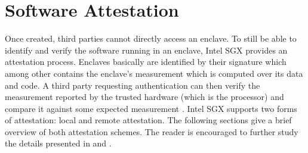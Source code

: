 \section{Software Attestation}
Once created, third parties cannot directly access an enclave. To still be able to identify and verify the software running in an enclave, Intel SGX provides an attestation process.
Enclaves basically are identified by their signature which among other contains the enclave's measurement which is computed over its data and code. A third party requesting
authentication can then verify the measurement reported by the trusted hardware (which is the processor) and compare it against some expected measurement \cite{Costan2016IntelSE}.
Intel SGX supports two forms of attestation: local and remote attestation. The following sections give a brief overview of both attestation schemes. The reader is encouraged to
further study the details presented in \cite{Costan2016IntelSE} and \cite{EnclaveWritersGuide}.

